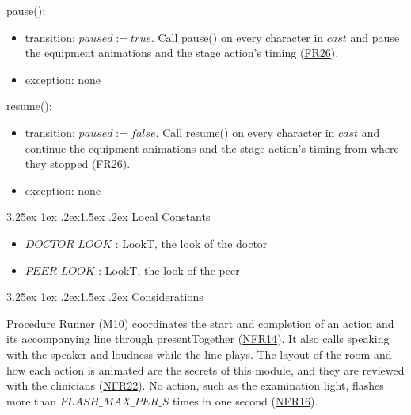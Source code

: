 \documentclass[10pt, titlepage]{article}
\makeatletter
\newcommand{\srsurl}{https://team-hindsight.github.io/ophthamology-game/SRS/SRS.pdf}
\newcommand{\srsitemref}[2]{\href{\srsurl\#nameddest=#1}{#2}}
\newcommand{\misref}[2]{\hyperref[mis:#1]{M#2}}
\renewcommand\paragraph{\@startsection{paragraph}{4}{\z@}%
  {3.25ex \@plus 1ex \@minus .2ex}{1.5ex \@plus .2ex}%
  {\normalfont\normalsize\bfseries}}
\newcommand{\T}[1]{\mathit{#1}}          %
\newcommand{\true}{\mathit{true}}
\newcommand{\false}{\mathit{false}}
\makeatother
\begin{document}
\begin{samepage}
\noindent pause():
\begin{itemize}
\item transition: $\T{paused} := \true$. Call pause() on every character
  in $\T{cast}$ and pause the equipment animations and the stage action's
  timing (\srsitemref{FR_Suspend}{FR26}).
\item exception: none
\end{itemize}
\end{samepage}
\par\pagebreak[0]

\begin{samepage}
\noindent resume():
\begin{itemize}
\item transition: $\T{paused} := \false$. Call resume() on every character
  in $\T{cast}$ and continue the equipment animations and the stage action's
  timing from where they stopped (\srsitemref{FR_Suspend}{FR26}).
\item exception: none
\end{itemize}
\end{samepage}
\par\pagebreak[0]

\paragraph{Local Constants}

\begin{itemize}
\item $\T{DOCTOR\_LOOK}$ : LookT, the look of the doctor
\item $\T{PEER\_LOOK}$ : LookT, the look of the peer
\end{itemize}

\paragraph{Considerations}

Procedure Runner (\misref{Runner}{10}) coordinates the start and completion
of an action and its accompanying line through presentTogether
(\srsitemref{NFR_AVSync}{NFR14}). It also calls speaking with the speaker
and loudness while the line plays. The layout of the room and how each
action is animated are the secrets of this module, and they are reviewed with
the clinicians (\srsitemref{NFR_ClinicalAccuracy}{NFR22}). No action, such as
the examination light, flashes more than $\T{FLASH\_MAX\_PER\_S}$ times in
one second (\srsitemref{NFR_Flashing}{NFR16}).
\end{document}
